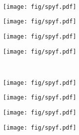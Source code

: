 \begin{figure}[H]
		\\
				\begin{subfigure}[b]{\fourfig\textwidth} 
			\texttt{[image: fig/spyf.pdf]}
		\end{subfigure}
		\hfil
		\begin{subfigure}[b]{\fourfig\textwidth} 
			\texttt{[image: fig/spyf.pdf]}
		\end{subfigure}
		\hfil
		\begin{subfigure}[b]{\fourfig\textwidth} 
			\texttt{[image: fig/spyf.pdf]}
		\end{subfigure}
		\hfil
		\begin{subfigure}[b]{\fourfig\textwidth} 
			\texttt{[image: fig/spyf.pdf]}
		\end{subfigure}
		\\
				\begin{subfigure}[b]{\fourfig\textwidth} 
			\texttt{[image: fig/spyf.pdf]}
		\end{subfigure}
		\hfil
		\begin{subfigure}[b]{\fourfig\textwidth} 
			\texttt{[image: fig/spyf.pdf]}
		\end{subfigure}
		\hfil
		\begin{subfigure}[b]{\fourfig\textwidth} 
			\texttt{[image: fig/spyf.pdf]}
		\end{subfigure}
		\hfil
		\begin{subfigure}[b]{\fourfig\textwidth} 
			\texttt{[image: fig/spyf.pdf]}
		\end{subfigure}
	\end{figure}